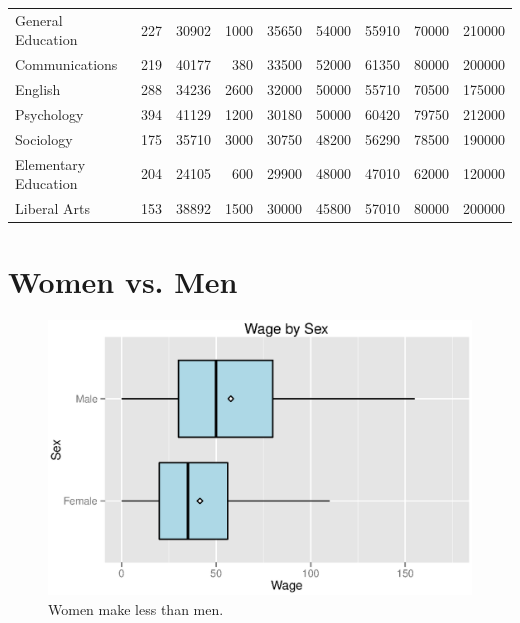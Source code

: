 \documentclass{exam}
\begin{document}
\begin{table}[ht]
\begin{tabular}{lrrrrrrrr}
      General Education    & 227   & 30902   & 1000 & 35650   & 54000  & 55910  & 70000   & 210000 \\
      Communications       & 219   & 40177   & 380  & 33500   & 52000  & 61350  & 80000   & 200000 \\
      English              & 288   & 34236   & 2600 & 32000   & 50000  & 55710  & 70500   & 175000 \\
      Psychology           & 394   & 41129   & 1200 & 30180   & 50000  & 60420  & 79750   & 212000 \\
      Sociology            & 175   & 35710   & 3000 & 30750   & 48200  & 56290  & 78500   & 190000 \\
      Elementary Education & 204   & 24105   & 600  & 29900   & 48000  & 47010  & 62000   & 120000 \\
      Liberal Arts         & 153   & 38892   & 1500 & 30000   & 45800  & 57010  & 80000   & 200000 \\
      \bottomrule
    \end{tabular}
  \end{table}


  \section{Women vs. Men}

  \begin{figure}[H]
    \centering
    \includegraphics[scale = 0.8]{figures/wa_wage_by_sex.eps}
    \caption{Women make less than men.}
  \end{figure}
  
\end{document}
